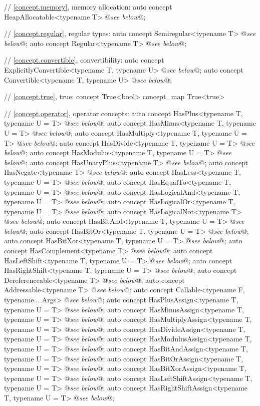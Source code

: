 \documentclass[american,twoside]{book}
\begin{document}
\begin{codeblock}
{  // \ref{concept.memory}, memory allocation:
  auto concept HeapAllocatable<typename T> @\textit{see below}@;

  // \ref{concept.regular}, regular types:
  auto concept Semiregular<typename T> @\textit{see below}@;
  auto concept Regular<typename T> @\textit{see below}@;

  // \ref{concept.convertible}, convertibility:
  auto concept ExplicitlyConvertible<typename T, typename U> @\textit{see below}@;
  auto concept Convertible<typename T, typename U> @\textit{see below}@;

  // \ref{concept.true}, true:
  concept True<bool> { }
  concept_map True<true> { }

  // \ref{concept.operator}, operator concepts:
  auto concept HasPlus<typename T, typename U = T> @\textit{see below}@;
  auto concept HasMinus<typename T, typename U = T> @\textit{see below}@;
  auto concept HasMultiply<typename T, typename U = T> @\textit{see below}@;
  auto concept HasDivide<typename T, typename U = T> @\textit{see below}@;
  auto concept HasModulus<typename T, typename U = T> @\textit{see below}@;
  auto concept HasUnaryPlus<typename T> @\textit{see below}@;
  auto concept HasNegate<typename T> @\textit{see below}@;
  auto concept HasLess<typename T, typename U = T> @\textit{see below}@;
  auto concept HasEqualTo<typename T, typename U = T> @\textit{see below}@;
  auto concept HasLogicalAnd<typename T, typename U = T> @\textit{see below}@;
  auto concept HasLogicalOr<typename T, typename U = T> @\textit{see below}@;
  auto concept HasLogicalNot<typename T> @\textit{see below}@;
  auto concept HasBitAnd<typename T, typename U = T> @\textit{see below}@;
  auto concept HasBitOr<typename T, typename U = T> @\textit{see below}@;
  auto concept HasBitXor<typename T, typename U = T> @\textit{see below}@;
  auto concept HasComplement<typename T> @\textit{see below}@;
  auto concept HasLeftShift<typename T, typename U = T> @\textit{see below}@;
  auto concept HasRightShift<typename T, typename U = T> @\textit{see below}@;
  auto concept Dereferenceable<typename T> @\textit{see below}@;
  auto concept Addressable<typename T> @\textit{see below}@;
  auto concept Callable<typename F, typename... Args> @\textit{see below}@;
  auto concept HasPlusAssign<typename T, typename U = T> @\textit{see below}@;
  auto concept HasMinusAssign<typename T, typename U = T> @\textit{see below}@;
  auto concept HasMultiplyAssign<typename T, typename U = T> @\textit{see below}@;
  auto concept HasDivideAssign<typename T, typename U = T> @\textit{see below}@;
  auto concept HasModulusAssign<typename T, typename U = T> @\textit{see below}@;
  auto concept HasBitAndAssign<typename T, typename U = T> @\textit{see below}@;
  auto concept HasBitOrAssign<typename T, typename U = T> @\textit{see below}@;
  auto concept HasBitXorAssign<typename T, typename U = T> @\textit{see below}@;
  auto concept HasLeftShiftAssign<typename T, typename U = T> @\textit{see below}@;
  auto concept HasRightShiftAssign<typename T, typename U = T> @\textit{see below}@;

}
\end{codeblock}
\end{document}
